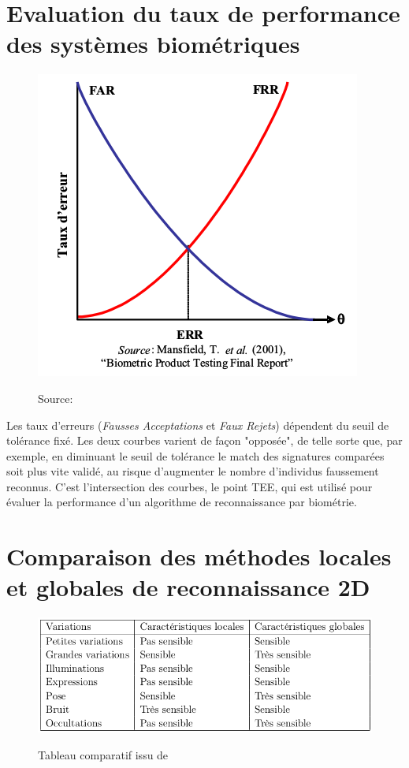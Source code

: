 \documentclass{sig-alternate-05-2015}
\begin{document}
\section{Evaluation du taux de performance des systèmes biométriques}
\begin{figure}[h!]
\center\includegraphics[scale=.5]{images/biometrie-performance}\label{perfo-systeme}
\caption{Source: \cite{Xphdthesis_1}}
\end{figure}
Les taux d'erreurs (\textit{Fausses Acceptations} et \textit{Faux Rejets}) dépendent du seuil de tolérance fixé. Les deux courbes varient de façon "opposée", de telle sorte que, par exemple, en diminuant le seuil de tolérance le match des signatures comparées soit plus vite validé, au risque d'augmenter le nombre d'individus faussement reconnus.  C'est l'intersection des courbes, le point TEE, qui est utilisé pour évaluer la performance d'un algorithme de reconnaissance par biométrie.

\section{Comparaison des méthodes locales et globales de reconnaissance 2D}
\begin{figure}[h!]
\center\includegraphics[scale=.4]{images/locales-vs-globales}\label{locales-vs-globales}
\caption{Tableau comparatif issu de \cite{Xphdthesis_1}}
\end{figure}
\end{document}
